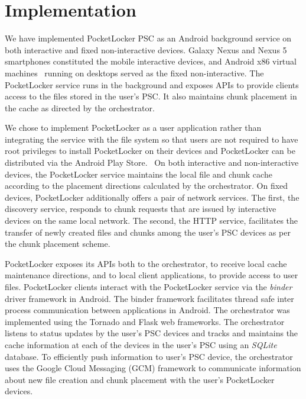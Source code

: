 
\section{Implementation}
\label{sec-implementation}

We have implemented PocketLocker PSC as an Android background service on both
interactive and fixed non-interactive devices. Galaxy Nexus and Nexus 5
smartphones constituted the mobile interactive devices, and Android x86
virtual machines~\cite{androidx86} running on desktops served as the fixed
non-interactive. The PocketLocker service runs in the background and exposes
APIs to provide clients access to the files stored in the user's PSC. It also
maintains chunk placement in the cache as directed by the orchestrator. 

We chose to implement PocketLocker as a user application rather than
integrating the service with the file system so that users are not required
to have root privileges to install PocketLocker on their devices and
PocketLocker can be distributed via the Android Play Store.~\cite{playstore}
On both interactive and non-interactive devices, the PocketLocker service
maintains the local file and chunk cache according to the placement
directions calculated by the orchestrator. On fixed devices, PocketLocker
additionally offers a pair of network services. The first, the discovery
service, responds to chunk requests that are issued by interactive devices on
the same local network. The second, the HTTP service, facilitates the
transfer of newly created files and chunks among the user's PSC devices as
per the chunk placement scheme.

PocketLocker exposes its APIs both to the orchestrator, to receive local
cache maintenance directions, and to local client applications, to provide
access to user files. PocketLocker clients interact with the PocketLocker
service via the \textit{binder} driver framework in Android. The binder
framework facilitates thread safe  inter process communication between
applications in Android. The orchestrator was implemented using the Tornado
and Flask web frameworks. The orchestrator listens to status updates by the
user's PSC devices and tracks and maintains the cache information at each of
the devices in the user's PSC using an \textit{SQLite} database. To
efficiently push information to user's PSC device, the orchestrator uses the
Google Cloud Messaging (GCM) framework to communicate information about new
file creation and chunk placement with the user's PocketLocker devices.
